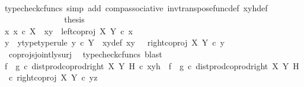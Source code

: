 \begin{isabellebody}
\ \ \ \ \ \ \ \ \ \ \ \ \ \ \isamarkupfalse%
\ {\isacharparenleft}{\kern0pt}typecheck{\isacharunderscore}{\kern0pt}cfuncs{\isacharcomma}{\kern0pt}\ simp\ add{\isacharcolon}{\kern0pt}\ comp{\isacharunderscore}{\kern0pt}associative{}\ inv{\isacharunderscore}{\kern0pt}transpose{\isacharunderscore}{\kern0pt}func{\isacharunderscore}{\kern0pt}def{}\ xyh{\isacharunderscore}{\kern0pt}def{\isacharparenright}{\kern0pt}\isanewline
\ \ \ \ \ \ \ \ \ \ \ \ \isamarkupfalse%
\ \isamarkupfalse%
\ {\isacharquery}{\kern0pt}thesis\isacommand{{\isachardot}{\kern0pt}}\isamarkupfalse%
\isanewline
\ \ \ \ \ \ \ \ \ \ \isamarkupfalse%
\isanewline
\ \ \ \ \ \ \ \ \ \ \ \ \isamarkupfalse%
\ {\isachardoublequoteopen}{\isasymnexists}x{\isachardot}{\kern0pt}\ x\ {\isasymin}\isactrlsub c\ X\ {\isasymand}\ xy\ {\isacharequal}{\kern0pt}\ left{\isacharunderscore}{\kern0pt}coproj\ X\ Y\ {\isasymcirc}\isactrlsub c\ x{\isachardoublequoteclose}\isanewline
\ \ \ \ \ \ \ \ \ \ \ \ \isamarkupfalse%
\ \isamarkupfalse%
\ y\ \ y{\isacharunderscore}{\kern0pt}type{\isacharbrackleft}{\kern0pt}type{\isacharunderscore}{\kern0pt}rule{\isacharbrackright}{\kern0pt}{\isacharcolon}{\kern0pt}\ {\isachardoublequoteopen}y\ {\isasymin}\isactrlsub c\ Y{\isachardoublequoteclose}\ \ xy{\isacharunderscore}{\kern0pt}def{\isacharcolon}{\kern0pt}\ {\isachardoublequoteopen}xy\ {\isacharequal}{\kern0pt}\ \ right{\isacharunderscore}{\kern0pt}coproj\ X\ Y\ {\isasymcirc}\isactrlsub c\ y{\isachardoublequoteclose}\isanewline
\ \ \ \ \ \ \ \ \ \ \ \ \ \ \isamarkupfalse%
\ \ coprojs{\isacharunderscore}{\kern0pt}jointly{\isacharunderscore}{\kern0pt}surj\ \isamarkupfalse%
\ {\isacharparenleft}{\kern0pt}typecheck{\isacharunderscore}{\kern0pt}cfuncs{\isacharcomma}{\kern0pt}\ blast{\isacharparenright}{\kern0pt}\isanewline
\ \ \ \ \ \ \ \ \ \ \ \ \isamarkupfalse%
\ {\isachardoublequoteopen}{\isacharparenleft}{\kern0pt}f\isactrlsup {\isasymflat}\ {\isasymamalg}\ g\isactrlsup {\isasymflat}\ {\isasymcirc}\isactrlsub c\ dist{\isacharunderscore}{\kern0pt}prod{\isacharunderscore}{\kern0pt}coprod{\isacharunderscore}{\kern0pt}right\ X\ Y\ H{\isacharparenright}{\kern0pt}\ {\isasymcirc}\isactrlsub c\ xyh\ {\isacharequal}{\kern0pt}\ {\isacharparenleft}{\kern0pt}f\isactrlsup {\isasymflat}\ {\isasymamalg}\ g\isactrlsup {\isasymflat}{\isacharparenright}{\kern0pt}\ {\isasymcirc}\isactrlsub c\ {\isacharparenleft}{\kern0pt}dist{\isacharunderscore}{\kern0pt}prod{\isacharunderscore}{\kern0pt}coprod{\isacharunderscore}{\kern0pt}right\ X\ Y\ H\ \ {\isasymcirc}\isactrlsub c\ {\isasymlangle}right{\isacharunderscore}{\kern0pt}coproj\ X\ Y\ {\isasymcirc}\isactrlsub c\ y{\isacharcomma}{\kern0pt}z{\isasymrangle}{\isacharparenright}{\kern0pt}{\isachardoublequoteclose}\isanewline

\end{isabellebody}

